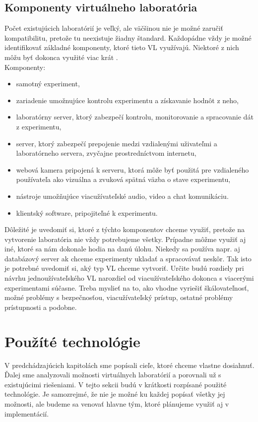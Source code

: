\subsection{Komponenty virtuálneho laboratória}
Počet existujúcich laboratórií je veľký, ale väčšinou nie je možné zaručiť kompatibilitu, pretože tu neexistuje žiadny štandard. Každopádne vždy je možné identifikovať základné komponenty, ktoré tieto VL využívajú. Niektoré z nich môžu byť dokonca využité viac krát \cite{article-components-vl}.\\

\noindent Komponenty:
\begin{itemize}
  \item samotný experiment,
  \item zariadenie umožnujúce kontrolu experimentu a získavanie hodnôt z neho,
  \item laboratórny server, ktorý zabezpečí kontrolu, monitorovanie a spracovanie dát z experimentu,
  \item server, ktorý zabezpečí prepojenie medzi vzdialenými uživateľmi a laboratórneho servera, zvyčajne prostredníctvom internetu,
  \item webová kamera pripojená k serveru, ktorá môže byť použitá pre vzdialeného používateľa ako vizuálna a zvuková spätná väzba o stave experimentu,
  \item nástroje umožňujúce viacužívateľské audio, video a chat komunikáciu.
  \item klientský software, pripojiteľné k experimentu.\\
\end{itemize}

Dôležité je uvedomiť si, ktoré z týchto komponentov chceme využiť, pretože na vytvorenie laboratória nie vždy potrebujeme všetky. Prípadne môžme využiť aj iné, ktoré sa nám dokonale hodia na danú úlohu. Niekedy sa používa napr. aj databázový server ak chceme experimenty ukladať a spracovávať neskôr. Tak isto je potrebné uvedomiť si, aký typ VL chceme vytvoriť. Určite budú rozdiely pri návrhu jednoužívateľského VL narozdiel od viacužívateľského dokonca s viacerými experimentami súčasne. Treba myslieť na to, ako vhodne vyriešiť škálovateľnosť, možné problémy s bezpečnosťou, viacužívateľský prístup, ostatné problémy prístupnosti a podobne.


\section{Použíté technológie}\label{used-technologies}
V predchádzajúcich kapitolách sme popísali cieľe, ktoré chceme vlastne dosiahnuť. Ďalej sme analyzovali možnosti virtuálnych laboratórií a porovnali už s existujúcimi riešeniami. V tejto sekcii budú v krátkosti rozpísané použité technológie. Je samozrejmé, že nie je možné ku každej popísať všetky jej možnosti, ale budeme sa venovať hlavne tým, ktoré plánujeme využiť aj v implementácií.

